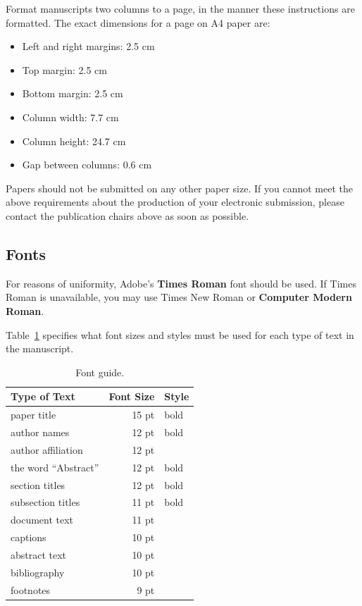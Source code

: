 \documentclass[11pt,a4paper]{article}
\begin{document}
Format manuscripts two columns to a page, in the manner these
instructions are formatted.
The exact dimensions for a page on A4 paper are:

\begin{itemize}
\item Left and right margins: 2.5 cm
\item Top margin: 2.5 cm
\item Bottom margin: 2.5 cm
\item Column width: 7.7 cm
\item Column height: 24.7 cm
\item Gap between columns: 0.6 cm
\end{itemize}

\noindent Papers should not be submitted on any other paper size.
If you cannot meet the above requirements about the production of your electronic submission, please contact the publication chairs above as soon as possible.

\subsection{Fonts}

For reasons of uniformity, Adobe's \textbf{Times Roman} font should be used.
If Times Roman is unavailable, you may use Times New Roman or \textbf{Computer Modern Roman}.

Table~\ref{font-table} specifies what font sizes and styles must be used for each type of text in the manuscript.

\begin{table}
\centering
\begin{tabular}{lrl}
\hline \textbf{Type of Text} & \textbf{Font Size} & \textbf{Style} \\ \hline
paper title & 15 pt & bold \\
author names & 12 pt & bold \\
author affiliation & 12 pt & \\
the word ``Abstract'' & 12 pt & bold \\
section titles & 12 pt & bold \\
subsection titles & 11 pt & bold \\
document text & 11 pt  &\\
captions & 10 pt & \\
abstract text & 10 pt & \\
bibliography & 10 pt & \\
footnotes & 9 pt & \\
\hline
\end{tabular}
\caption{\label{font-table} Font guide. }
\end{table}
\end{document}
